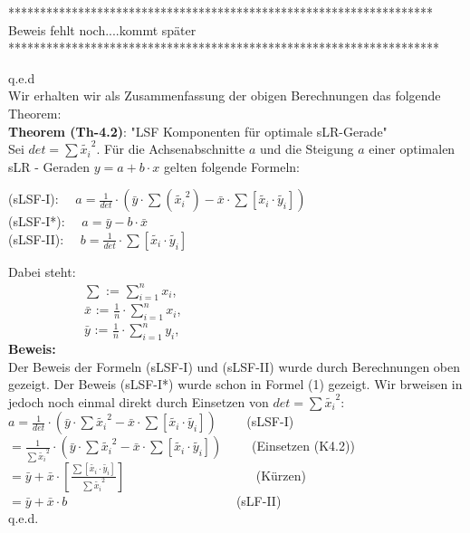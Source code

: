 \documentclass[12pt]{article}
\begin{document}
{\color{red}
{*******************************************************************\\ 
Beweis fehlt noch....kommt später\\
********************************************************************\\}}

q.e.d\\[0.2cm]
Wir erhalten wir als Zusammenfassung der obigen Berechnungen das folgende Theorem: \\[0.4cm]
%
%
\textbf{Theorem (Th-4.2)}: "LSF Komponenten für optimale sLR-Gerade" \\[0.2cm]
Sei $ det = \sum{\widetilde{x_i}}^2 $. Für die Achsenabschnitte $a$ und die Steigung $a$ einer optimalen sLR - Geraden $ y = a +  b \cdot x $ gelten folgende Formeln:\\[0.5cm]
\begin{large}
(sLSF-I): $ \quad a = \frac{1}{det} \cdot (\bar{y} \cdot \sum{(\widetilde{x_i}^2)} - \bar{x} \cdot  \sum{[\widetilde{x_i} \cdot \widetilde{y_i}]}) \quad\quad $   \\[0.3cm] 
(sLSF-I*): $ \quad a = \bar{y} - b \cdot \bar{x} \qquad \qquad \qquad \qquad\qquad \qquad $ \\[0.3cm]                                   
(sLSF-II): $ \quad b = \frac{1}{det} \cdot {\sum[\widetilde{x_i} \cdot \widetilde{y_i}]} \qquad \qquad \qquad \qquad $  \\[0.5cm]
\end{large}
Dabei steht:\\
$ \quad\quad\quad\quad\quad\quad \sum $  := $ \sum\limits_{i=1}^n x_i $,\\
$ \quad\quad\quad\quad\quad\quad \bar{x} $  := $ \frac{1}{n} \cdot {\sum\limits_{i=1}^n x_i} $, \\
$ \quad\quad\quad\quad\quad\quad \bar{y} $  := $ \frac{1}{n} \cdot {\sum\limits_{i=1}^n y_i} $, \\
\textbf{Beweis:}\\[0.2cm]
%
Der Beweis der Formeln (sLSF-I) und (sLSF-II) wurde durch Berechnungen oben gezeigt. Der Beweis (sLSF-I*) wurde schon in Formel (1) gezeigt. Wir brweisen in jedoch noch einmal direkt durch Einsetzen von $ det = \sum{\widetilde{x_i}}^2 $:\\[0.2cm]
$ a = \frac{1}{det} \cdot (\bar{y} \cdot \sum{\widetilde{x_i}^2} - \bar{x} \cdot  \sum{[\widetilde{x_i} \cdot \widetilde{y_i}]})\qquad $                (sLSF-I) \\[0.2cm] 
$  = \frac{1}{\sum{\widetilde{x_i}}^2} \cdot (\bar{y} \cdot \sum{{\widetilde{x_i}}^2} - \bar{x} \cdot  \sum{[\widetilde{x_i} \cdot \widetilde{y_i}]})\qquad $ (Einsetzen (K4.2))\\[0.2cm]
$ = \bar{y} + \bar{x} \cdot [\frac{\sum{[\widetilde{x_i} \cdot \widetilde{y_i}]}}{\sum{\widetilde{x_i}}^2}] \qquad \qquad \qquad \qquad \qquad $ (Kürzen)\\[0.3cm]
$ = \bar{y} + \bar{x} \cdot b \qquad \qquad\qquad \qquad \qquad \qquad \quad $ (sLF-II)\\    q.e.d.
\end{document}
